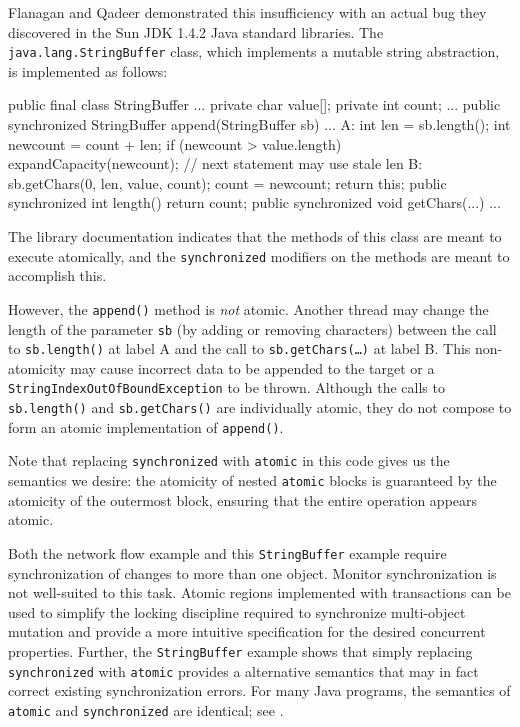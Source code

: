 Flanagan and Qadeer \cite{FlanaganQa03} demonstrated this
insufficiency with an
actual bug they discovered in the Sun JDK 1.4.2 Java standard
libraries.  The \texttt{java.lang.StringBuffer} class,
which implements a mutable string abstraction, is implemented as follows:
\begin{inlinecode}
public final class StringBuffer ... {
  private char value[];
  private int count;
  ... 
  public synchronized
  StringBuffer append(StringBuffer sb) {
    ...
A:  int len = sb.length();
    int newcount = count + len; 
    if (newcount > value.length)
      expandCapacity(newcount);
    // next statement may use stale len
B:  sb.getChars(0, len, value, count);
    count = newcount;
    return this;
  }
  public synchronized int length() { return count; }
  public synchronized void getChars(...) { ... }
}
\end{inlinecode}

The library documentation indicates that the methods of this class are meant
to execute atomically, and the {\tt synchronized} modifiers on the
methods are meant to accomplish this.

However, the {\tt append()} method is \emph{not} atomic.  Another
thread may change the length of the parameter \texttt{sb} (by adding
or removing characters) between the call to \texttt{sb.length()} at
label A and the call to \texttt{sb.getChars(\ldots)} at label B.
This non-atomicity may cause incorrect data to be appended to the
target or a \texttt{StringIndexOutOfBoundException} to be thrown. 
Although the calls to
\texttt{sb.length()} and \texttt{sb.getChars()} are individually
atomic, they do not compose to form an atomic implementation of
\texttt{append()}.  

Note that replacing {\tt synchronized} with {\tt atomic} in
this code gives us the semantics
we desire: the atomicity of nested {\tt atomic} blocks is guaranteed
by the atomicity of the outermost block, ensuring that the entire
operation appears atomic.

Both the network flow example and this {\tt StringBuffer} example require
synchronization of
changes to more than one object.
Monitor synchronization is not
well-suited to this task.  Atomic regions implemented with
transactions can be used to simplify the locking discipline required
to synchronize multi-object mutation
and provide a more intuitive specification for the desired
concurrent properties.  Further, the {\tt StringBuffer} example shows
that simply replacing {\tt synchronized} with {\tt atomic} provides a
alternative semantics that may in fact correct existing
synchronization errors.
For many Java programs, the
semantics of {\tt atomic} and {\tt synchronized} are identical; see
.

